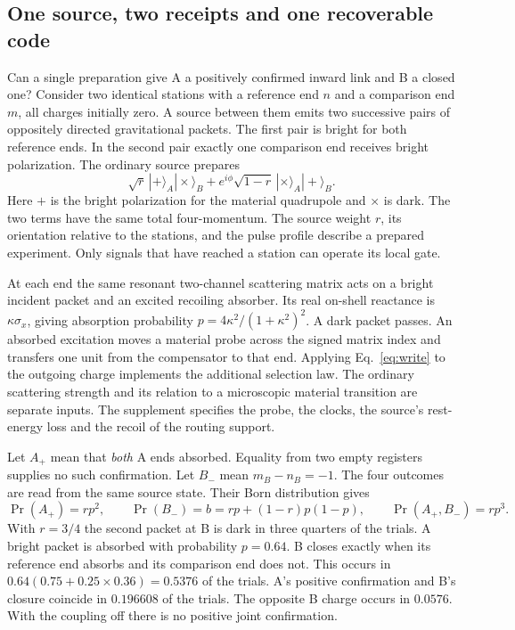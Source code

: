 \subsection{One source, two receipts and one recoverable code}\label{sec:joint}
Can a single preparation give A a positively confirmed inward link and B a closed one? Consider two identical stations with a reference end \(n\) and a comparison end \(m\), all charges initially zero. A source between them emits two successive pairs of oppositely directed gravitational packets. The first pair is bright for both reference ends. In the second pair exactly one comparison end receives bright polarization. The ordinary source prepares
\[
 \sqrt r\,|+\rangle_A|\times\rangle_B
       +e^{i\phi}\sqrt{1-r}\,|\times\rangle_A|+\rangle_B .
\]
Here \(+\) is the bright polarization for the material quadrupole and \(\times\) is dark. The two terms have the same total four-momentum. The source weight \(r\), its orientation relative to the stations, and the pulse profile describe a prepared experiment. Only signals that have reached a station can operate its local gate.

At each end the same resonant two-channel scattering matrix acts on a bright incident packet and an excited recoiling absorber. Its real on-shell reactance is \(\kappa\sigma_x\), giving absorption probability \(p=4\kappa^2/(1+\kappa^2)^2\). A dark packet passes. An absorbed excitation moves a material probe across the signed matrix index and transfers one unit from the compensator to that end. Applying Eq.~\eqref{eq:write} to the outgoing charge implements the additional selection law. The ordinary scattering strength and its relation to a microscopic material transition are separate inputs. The supplement specifies the probe, the clocks, the source's rest-energy loss and the recoil of the routing support.

Let \(A_+\) mean that \emph{both} A ends absorbed. Equality from two empty registers supplies no such confirmation. Let \(B_-\) mean \(m_B-n_B=-1\). The four outcomes are read from the same source state. Their Born distribution gives
\[
 {\Pr}(A_+)=rp^2,\qquad {\Pr}(B_-)=b=rp+(1-r)p(1-p),
 \qquad {\Pr}(A_+,B_-)=rp^3 .
\]
With \(r=3/4\) the second packet at B is dark in three quarters of the trials. A bright packet is absorbed with probability \(p=0.64\). B closes exactly when its reference end absorbs and its comparison end does not. This occurs in \(0.64(0.75+0.25\times0.36)=0.5376\) of the trials. A's positive confirmation and B's closure coincide in \(0.196608\) of the trials. The opposite B charge occurs in \(0.0576\). With the coupling off there is no positive joint confirmation.

